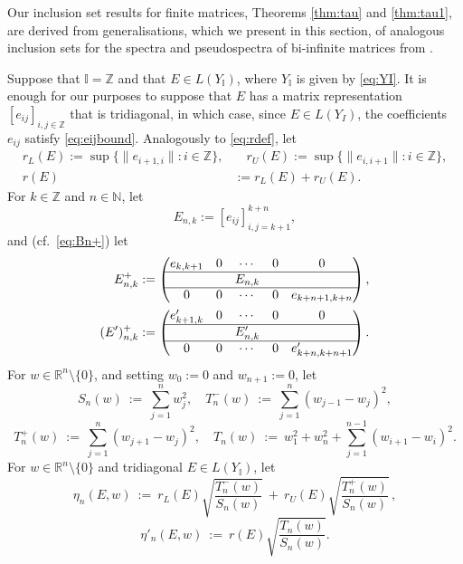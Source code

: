 \documentclass[preprint,1p,11pt]{elsarticle}
\newcommand{\bl}[1]{\textcolor{blue}{#1}}   %
\newcommand\N{{\mathbb N}}
\newcommand\I{{\mathbb I}}
\newcommand\R{{\mathbb R}}
\newcommand\Z{{\mathbb Z}}
\numberwithin{equation}{section}   %
\numberwithin{figure}{section}  %
\begin{document}
Our inclusion set results for finite matrices, Theorems \ref{thm:tau} and \ref{thm:tau1}, are derived from generalisations, which we present in this section,  of analogous inclusion sets for the spectra and pseudospectra of bi-infinite matrices from \cite{CW.Heng.ML:SpecIncl1}. %

Suppose that $\I=\Z$ and that $E\in L(Y_\I)$, where $Y_\I$ is given by \eqref{eq:YI}. It is enough for our purposes to suppose that $E$ has a matrix representation $[e_{ij}]_{i,j\in \Z}$ that is tridiagonal, in which case, since $E\in L(Y_I)$, the coefficients $e_{ij}$ satisfy \eqref{eq:eijbound}. Analogously to \eqref{eq:rdef}, let
\begin{equation}  \label{eq:rdef2}
\begin{aligned}
r_L(E) := \sup\{\|e_{i+1,i}\|:i\in \Z\}, &\quad r_U(E) := \sup\{\|e_{i,i+1}\|:i\in \Z\},\\
r(E) & := r_L(E)+r_U(E).
\end{aligned}
\end{equation}
For $k\in \Z$ and $n\in \N$, let
$$
E_{n,k}:=[e_{ij}]_{i,j=k+1}^{k+n},
$$ 
and (cf.~\eqref{eq:Bn+}) let
\begin{equation} \label{eq:En+}
\begin{aligned}
E^+_{n,k} &:= \begin{pmatrix}
e_{k,k+1} & 0&\cdots&0& 0\\\hline
& & E_{n,k}\\\hline
0& 0 &\cdots&0 & e_{k+n+1,k+n}
\end{pmatrix},\\ 
(E')^+_{n,k} &:= \begin{pmatrix}
e'_{k+1,k} & 0&\cdots&0& 0\\\hline
& & E'_{n,k}\\\hline
0& 0 &\cdots&0 & e'_{k+n,k+n+1}
\end{pmatrix}.
\end{aligned}
\end{equation}
For $w\in \R^n\setminus \{0\}$, and setting $w_0:=0$ and $w_{n+1} := 0$, let
\begin{equation*} %
S_{n}(w)\ :=\ \sum_{j=1}^{n}w_{j}^{2}, \quad T_{n}^{-}(w)\ :=\
\sum_{j=1}^{n}\left(w_{j-1}-w_{j}\right)^{2},
\end{equation*}
\[
T_{n}^{+}(w)\ :=\ \sum_{j=1}^{n}\left(w_{j+1}-w_{j}\right)^{2}, \quad T_{n}(w)\ :=\
w_{1}^{2}+w_{n}^{2}+\sum_{j=1}^{n-1}\left(w_{i+1}-w_{i}\right)^{2}.
\]
For $w\in \R^n\setminus \{0\}$ and tridiagonal $E\in L(Y_\I)$, let
\begin{equation} \label{eq:epsn1}
\eta_n(E,w)\ :=\
r_L(E)\sqrt{\frac{T_{n}^{-}(w)}{S_{n}(w)}}\ +\
r_U(E)\sqrt{\frac{T_{n}^{+}(w)}{S_{n}(w)}}\,,
\end{equation}
\begin{equation} \label{eq:epsn2}
\eta'_n(E,w)\ :=\ r(E)\sqrt{\displaystyle\frac{T_{n}(w)}{S_{n}(w)}}.
\end{equation}
\end{document}
